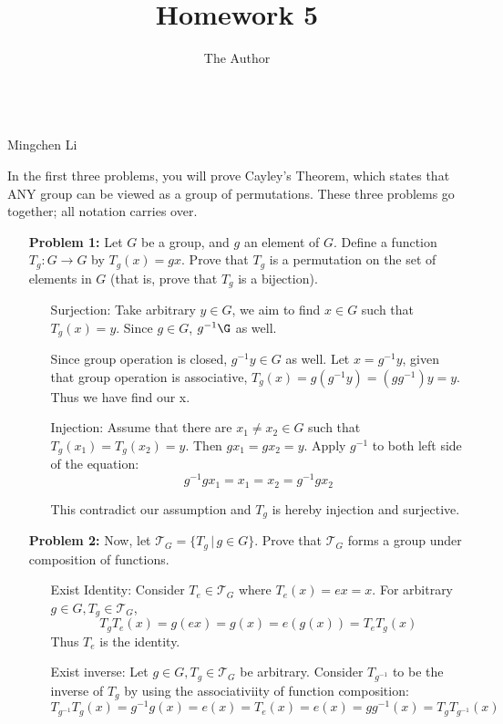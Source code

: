 \documentclass[11pt, oneside]{article}
\title{Homework 5}
\author{The Author}
\begin{document}
\begin{center}\\Mingchen Li \\ \end{center}
\thispagestyle{empty}



\hrulefill %

In the first three problems, you will prove Cayley's Theorem, which states that ANY group can be viewed as a group of permutations. These three problems go together; all notation  carries over.

\begin{enumerate}



\item[{\bf Problem 1:}] Let $G$ be a group, and $g$ an element of $G$. Define a function $T_g:G\rightarrow G$ by $T_g(x) = gx$. Prove that $T_g$ is a permutation on the set of elements in $G$ (that is, prove that $T_g$ is a bijection).



\begin{enumerate}
    \item[Surjection:]
    Take arbitrary $y\in G$, we aim to find $x\in G$ such that $T_g(x)=y$. Since $g\in G$, $g^{-1}\G$ as well. 
    
    Since group operation is closed, $g^{-1}y\in G$ as well. Let $x=g^{-1}y$, given that group operation is associative, $T_g(x)=g(g^{-1}y)=(gg^{-1})y=y$. Thus we have find our x.
    \item[Injection:]
    Assume that there are $x_1\neq x_2\in G$ such that $T_g(x_1)=T_g(x_2)=y$. Then $gx_1=gx_2=y$. Apply $g^{-1}$ to both left side of the equation: 
    \[g^{-1}gx_1=x_1=x_2=g^{-1}gx_2\]
    
    This contradict our assumption and $T_g$ is hereby injection and surjective.
\end{enumerate}
    

\newpage
\item[{\bf Problem 2:}]  Now, let $\mathcal T_G = \{T_g\,|\, g\in G\}$. Prove that $\mathcal T_G$ forms a group under composition of functions.
\begin{enumerate}
    \item[Exist Identity: ] Consider $T_e \in \mathcal T_G $ where $T_e(x)=ex=x$. For arbitrary $g\in G, T_g\in \mathcal{T}_G$, 
    \[T_gT_e(x)=g(ex)=g(x)=e(g(x))=T_eT_g(x)\]
    Thus $T_e$ is the identity.
    \item[Exist inverse: ] Let $g\in G, T_g\in \mathcal{T}_G$ be arbitrary. Consider $T_{g^{-1}}$ to be the inverse of $T_g$ by using the associativiity of function composition:
    \[T_{g^{-1}}T_g(x)=g^{-1}g(x)= e(x)= T_e(x)=e(x)=gg^{-1}(x)=T_gT_{g^{-1}}(x)\]
    

\end{enumerate}
\end{enumerate}
\end{document}
